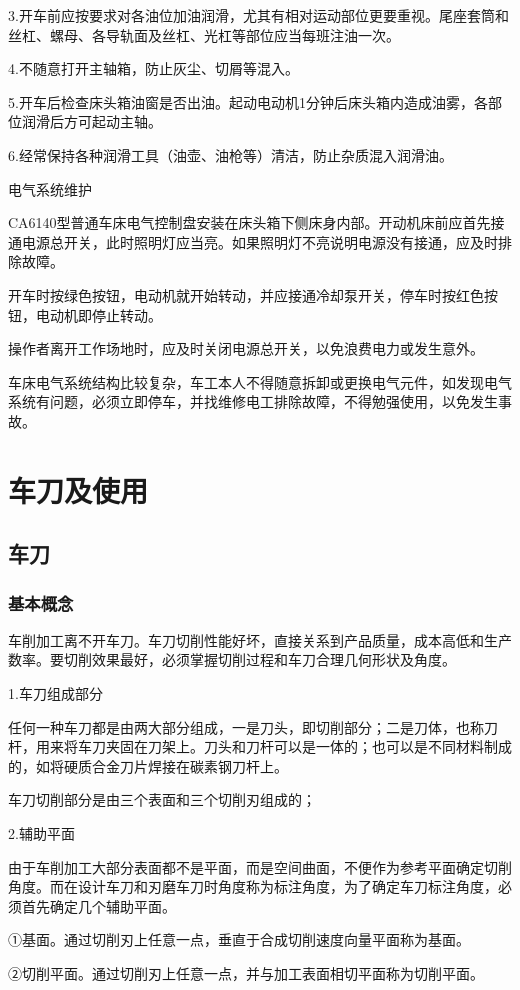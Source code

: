 \documentclass{ctexbook}
\begin{document}
3.开车前应按要求对各油位加油润滑，尤其有相对运动部位更要重视。尾座套筒和丝杠、螺母、各导轨面及丝杠、光杠等部位应当每班注油一次。

4.不随意打开主轴箱，防止灰尘、切屑等混入。

5.开车后检查床头箱油窗是否出油。起动电动机1分钟后床头箱内造成油雾，各部位润滑后方可起动主轴。

6.经常保持各种润滑工具（油壶、油枪等）清洁，防止杂质混入润滑油。

电气系统维护

CA6140型普通车床电气控制盘安装在床头箱下侧床身内部。开动机床前应首先接通电源总开关，此时照明灯应当亮。如果照明灯不亮说明电源没有接通，应及时排除故障。

开车时按绿色按钮，电动机就开始转动，并应接通冷却泵开关，停车时按红色按钮，电动机即停止转动。

操作者离开工作场地时，应及时关闭电源总开关，以免浪费电力或发生意外。

车床电气系统结构比较复杂，车工本人不得随意拆卸或更换电气元件，如发现电气系统有问题，必须立即停车，并找维修电工排除故障，不得勉强使用，以免发生事故。
\section{车刀及使用}
\subsection{车刀}
\subsubsection{基本概念}
车削加工离不开车刀。车刀切削性能好坏，直接关系到产品质量，成本高低和生产数率。要切削效果最好，必须掌握切削过程和车刀合理几何形状及角度。

1.车刀组成部分

任何一种车刀都是由两大部分组成，一是刀头，即切削部分；二是刀体，也称刀杆，用来将车刀夹固在刀架上。刀头和刀杆可以是一体的；也可以是不同材料制成的，如将硬质合金刀片焊接在碳素钢刀杆上。

车刀切削部分是由三个表面和三个切削刃组成的；

2.辅助平面

由于车削加工大部分表面都不是平面，而是空间曲面，不便作为参考平面确定切削角度。而在设计车刀和刃磨车刀时角度称为标注角度，为了确定车刀标注角度，必须首先确定几个辅助平面。

①基面。通过切削刃上任意一点，垂直于合成切削速度向量平面称为基面。

②切削平面。通过切削刃上任意一点，并与加工表面相切平面称为切削平面。
\end{document}

